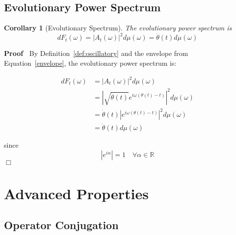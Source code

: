 \documentclass{article}
\newenvironment{proof}{\noindent\textbf{Proof\ }}{\hspace*{\fill}$\Box$\medskip}
\newtheorem{corollary}{Corollary}
\begin{document}
\subsection{Evolutionary Power Spectrum}

\begin{corollary}
  [Evolutionary Spectrum]\label{cor:evolving_spec} The evolutionary power
  spectrum is
  \begin{equation}
    \label{eq:evolutionary_spec} dF_t (\omega) = |A_t (\omega) |^2 d \mu
    (\omega) = \dot{\theta} (t) d \mu (\omega)
  \end{equation}
\end{corollary}

\begin{proof}
  By Definition~\ref{def:oscillatory} and the envelope from
  Equation~\eqref{envelope}, the evolutionary power spectrum is:
  
  \begin{align}
    dF_t (\omega) & = |A_t (\omega) |^2 d \mu (\omega) \\
    & = \left| \sqrt{\dot{\theta} (t)} e^{i \omega (\theta (t) - t)}
    \right|^2 d \mu (\omega) \\
    & = \dot{\theta} (t) |e^{i \omega (\theta (t) - t)} |^2 d \mu (\omega) \\
    & = \dot{\theta} (t) d \mu (\omega) 
  \end{align}
  
  since
  \begin{equation}
    |e^{i \alpha} | = 1 \quad \forall \alpha \in \mathbb{R}
  \end{equation}
\end{proof}

\section{Advanced Properties}

\subsection{Operator Conjugation}
\end{document}
